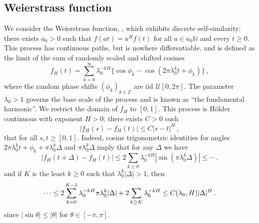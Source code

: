 \documentclass[a4paper]{article}
\begin{document}
\subsection{Weierstrass function} %
\label{sub:weierstrass_function}
We consider the Weierstrass function, \cite{decrouez2015,decrouez2013estimation}, which
exhibits discrete self-similarity: there exists $a_0 > 0$ such that $f(at) = a^H f(t)$
for all $a\in a_0\mathbb{N}$ and every $t\geq 0$. This process has continuous paths,
but is nowhere differentiable, and is defined as the limit of the sum of randomly
scaled and shifted cosines
\begin{equation}\label{eq:def_weir}
    f_H(t) = \sum_{k=0}^\infty \lambda_0^{-k H} \bigl\{
            \cos \phi_k - \cos(2\pi \lambda_0^k t + \phi_k)
        \bigr\} \,,
\end{equation}
where the random phase shifts $(\phi_k)_{k\in\mathbb{Z}}$ are iid $\mathcal{U}[0, 2\pi]$.
The parameter $\lambda_0 > 1$ governs the base scale of the process and is known as
``the fundamental harmonic''. We restrict the domain of $f_H$ to $[0,1]$. This process
is H\"older continuous with exponent $H>0$: there exists $C > 0$ such
\begin{equation}\label{eq:def_holder}
    \bigl| f_H(s) - f_H(t) \bigr| \leq C |s - t|^H \,,
\end{equation}
that for all $s,t\geq [0,1]$. Indeed, cosine trigonometric identities for angles
$2\pi \lambda_0^k t + \phi_k + \pi \lambda_0^k \Delta$ and $\pi \lambda_0^k \Delta$
imply that for any $\Delta$ we have
\begin{equation*}
    \bigl| f_H(t+\Delta) - f_H(t) \bigr|
        \leq 2 \sum_{k \geq 0} \lambda_0^{-k H} |\sin(\pi \lambda_0^k \Delta)|
        \leq \cdots \,.
\end{equation*}
and if $K$ is the least $k\geq 0$ such that $\lambda_0^k |\Delta| > 1$, then
\begin{equation*}
    \cdots 
        \leq 2 \sum_{k=0}^{K-1} \lambda_0^{-k H} \pi \lambda_0^k |\Delta|
            + 2 \sum_{k\geq K} \lambda_0^{-k H} \\
        \leq C(\lambda_0, H) |\Delta|^H\,.
\end{equation*}
since $|\sin \theta|\leq |\theta|$ for $\theta\in[-\pi,\pi]$.
\end{document}
